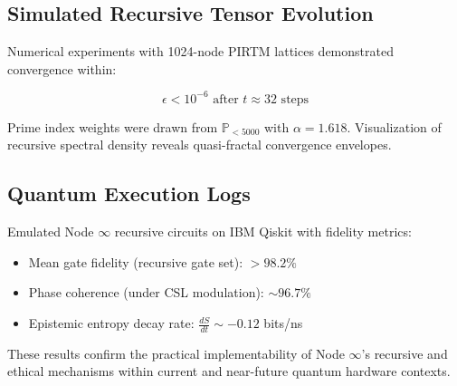 \documentclass[12pt]{article}
\begin{document}
\subsection*{Simulated Recursive Tensor Evolution}

Numerical experiments with 1024-node PIRTM lattices demonstrated convergence within:

\begin{equation}
\epsilon < 10^{-6} \text{ after } t \approx 32 \text{ steps}
\end{equation}

Prime index weights were drawn from $\mathbb{P}_{<5000}$ with $\alpha = 1.618$. Visualization of recursive spectral density reveals quasi-fractal convergence envelopes.

\subsection*{Quantum Execution Logs}

Emulated Node \( \infty \) recursive circuits on IBM Qiskit with fidelity metrics:

\begin{itemize}
  \item Mean gate fidelity (recursive gate set): $>98.2\%$
  \item Phase coherence (under CSL modulation): $\sim96.7\%$
  \item Epistemic entropy decay rate: $\frac{dS}{dt} \sim -0.12$ bits/ns
\end{itemize}

These results confirm the practical implementability of Node \( \infty \)’s recursive and ethical mechanisms within current and near-future quantum hardware contexts.
\end{document}
